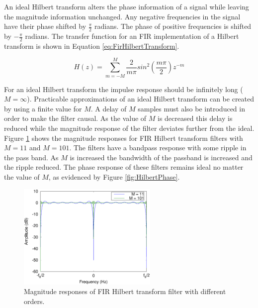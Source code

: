 
		An ideal Hilbert transform alters the phase information of a signal while leaving the magnitude information
		unchanged. Any negative frequencies in the signal have their phase shifted by $\frac{\pi}{2}$ radians.  The
		phase of positive frequencies is shifted by $-\frac{\pi}{2}$ radians. The transfer function for an FIR
		implementation of a Hilbert transform is shown in Equation \ref{eq:FirHilbertTransform}.

		\begin{equation}
			H(z) = \sum_{m = -M}^{M} \frac{2}{m\pi} sin^{2} \left( \frac{m\pi}{2} \right) z^{-m}
			\label{eq:FirHilbertTransform}
		\end{equation}

		For an ideal Hilbert transform the impulse response should be infinitely long ($M = \infty$). Practicable
		approximations of an ideal Hilbert transform can be created by using a finite value for $M$. A delay of $M$
		samples must also be introduced in order to make the filter causal. As the value of $M$ is decreased this
		delay is reduced while the magnitude response of the filter deviates further from the ideal. Figure
		\ref{fig:HilbertMagnitude} shows the magnitude responses for FIR Hilbert transform filters with $M = 11$
		and $M = 101$. The filters have a bandpass response with some ripple in the pass band. As $M$ is increased
		the bandwidth of the passband is increased and the ripple reduced. The phase response of these filters
		remains ideal no matter the value of $M$, as evidenced by Figure \ref{fig:HilbertPhase}.

		\begin{figure}[h!]
			\centering
			\includegraphics[width=0.6\textwidth]{chapter3/Images/HilbertMagnitudeResponses.eps}
			\caption{Magnitude responses of FIR Hilbert transform filter with different orders.}
			\label{fig:HilbertMagnitude}
		\end{figure}

